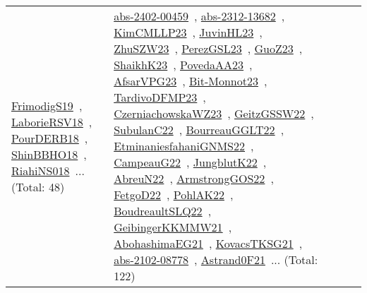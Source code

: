 {\begin{longtable}{lp{3cm}>{\raggedright\arraybackslash}p{6cm}>{\raggedright\arraybackslash}p{6cm}>{\raggedright\arraybackslash}p{8cm}}
\href{../works/FrimodigS19.pdf}{FrimodigS19}~\cite{FrimodigS19}, \href{../works/LaborieRSV18.pdf}{LaborieRSV18}~\cite{LaborieRSV18}, \href{../works/PourDERB18.pdf}{PourDERB18}~\cite{PourDERB18}, \href{../works/ShinBBHO18.pdf}{ShinBBHO18}~\cite{ShinBBHO18}, \href{../works/RiahiNS018.pdf}{RiahiNS018}~\cite{RiahiNS018}... (Total: 48) & \href{../works/abs-2402-00459.pdf}{abs-2402-00459}~\cite{abs-2402-00459}, \href{../works/abs-2312-13682.pdf}{abs-2312-13682}~\cite{abs-2312-13682}, \href{../works/KimCMLLP23.pdf}{KimCMLLP23}~\cite{KimCMLLP23}, \href{../works/JuvinHL23.pdf}{JuvinHL23}~\cite{JuvinHL23}, \href{../works/ZhuSZW23.pdf}{ZhuSZW23}~\cite{ZhuSZW23}, \href{../works/PerezGSL23.pdf}{PerezGSL23}~\cite{PerezGSL23}, \href{../works/GuoZ23.pdf}{GuoZ23}~\cite{GuoZ23}, \href{../works/ShaikhK23.pdf}{ShaikhK23}~\cite{ShaikhK23}, \href{../works/PovedaAA23.pdf}{PovedaAA23}~\cite{PovedaAA23}, \href{../works/AfsarVPG23.pdf}{AfsarVPG23}~\cite{AfsarVPG23}, \href{../works/Bit-Monnot23.pdf}{Bit-Monnot23}~\cite{Bit-Monnot23}, \href{../works/TardivoDFMP23.pdf}{TardivoDFMP23}~\cite{TardivoDFMP23}, \href{../works/CzerniachowskaWZ23.pdf}{CzerniachowskaWZ23}~\cite{CzerniachowskaWZ23}, \href{../works/GeitzGSSW22.pdf}{GeitzGSSW22}~\cite{GeitzGSSW22}, \href{../works/SubulanC22.pdf}{SubulanC22}~\cite{SubulanC22}, \href{../works/BourreauGGLT22.pdf}{BourreauGGLT22}~\cite{BourreauGGLT22}, \href{../works/EtminaniesfahaniGNMS22.pdf}{EtminaniesfahaniGNMS22}~\cite{EtminaniesfahaniGNMS22}, \href{../works/CampeauG22.pdf}{CampeauG22}~\cite{CampeauG22}, \href{../works/JungblutK22.pdf}{JungblutK22}~\cite{JungblutK22}, \href{../works/AbreuN22.pdf}{AbreuN22}~\cite{AbreuN22}, \href{../works/ArmstrongGOS22.pdf}{ArmstrongGOS22}~\cite{ArmstrongGOS22}, \href{../works/FetgoD22.pdf}{FetgoD22}~\cite{FetgoD22}, \href{../works/PohlAK22.pdf}{PohlAK22}~\cite{PohlAK22}, \href{../works/BoudreaultSLQ22.pdf}{BoudreaultSLQ22}~\cite{BoudreaultSLQ22}, \href{../works/GeibingerKKMMW21.pdf}{GeibingerKKMMW21}~\cite{GeibingerKKMMW21}, \href{../works/AbohashimaEG21.pdf}{AbohashimaEG21}~\cite{AbohashimaEG21}, \href{../works/KovacsTKSG21.pdf}{KovacsTKSG21}~\cite{KovacsTKSG21}, \href{../works/abs-2102-08778.pdf}{abs-2102-08778}~\cite{abs-2102-08778}, \href{../works/Astrand0F21.pdf}{Astrand0F21}~\cite{Astrand0F21}... (Total: 122)\\

\end{longtable}}
